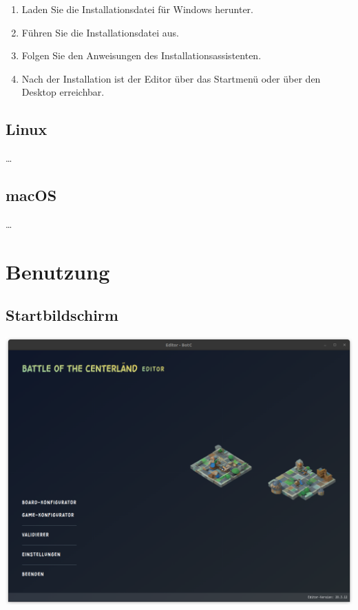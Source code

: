 \documentclass[12pt]{gruppe-11-article-a5}
\begin{document}
\begin{enumerate}
	\item Laden Sie die Installationsdatei für Windows herunter.
	\item Führen Sie die Installationsdatei aus.
	\item Folgen Sie den Anweisungen des Installationsassistenten.
	\item Nach der Installation ist der Editor über das Startmenü oder über den Desktop erreichbar.
\end{enumerate}

\subsection{Linux}\label{subsec:linux}

\dots

\subsection{macOS}\label{subsec:macos}

\dots


\section{Benutzung}\label{sec:benutzung}

\subsection{Startbildschirm}\label{subsec:startbildschirm}

\includegraphics[width=\textwidth]{./Handbuch/assets/Startbildschirm}
\end{document}
